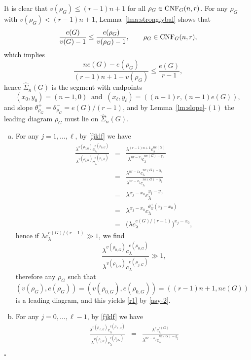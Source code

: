 \documentclass[12pt]{article}
\newenvironment{Proof}{\removelastskip\par\medskip
\noindent{\em Proof.} \rm}{\penalty-20\null\hfill$\square$\par\medbreak}
\numberwithin{equation}{section}
\begin{document}
\begin{Proof}
  It is clear that $v(\rho_G)\le (r-1)n+1$ for all $\rho_G\in {\rm CNF}_G(n,r)$. For any $\rho_G$ with $v(\rho_G)<(r-1)n+1$,
 Lemma~\ref{lma:stronglybal} shows that 
\begin{equation}\label{condi-1}
  \frac {e(G)}{v(G)-1}\le\frac{e(\rho_G)}{v(\rho_G)-1},
  \qquad
  \rho_G\in {\rm CNF}_G(n,r), 
\end{equation}
 which implies 
\begin{equation}
\nonumber
          \frac{ne(G)-e(\rho_G)}{(r-1)n+1-v(\rho_G)}\le\frac{e(G)}{r-1}, 
\end{equation}
 hence 
$\widehat{\Sigma}_n(G)$ 
 is the segment with endpoints
 $$
 (x_0,y_0)=(n-1,0)
 \ \mbox{ and } \ 
 (x_\ell,y_\ell)=((n-1)r,(n-1) e(G)),
 $$ 
 and slope
 $
 \theta^+_{\rho_G}
=\theta^-_{\rho_G}
=
 e(G) / ( r-1)$,
 and by Lemma~\ref{lm:slope}-$(1)$
 the leading diagram $\rho_G$ must lie on 
$\widehat{\Sigma}_n(G)$.  
 \begin{enumerate}[a)]
   \item 
     For any $j=1,\dots,\ell$, by
     \eqref{fjklf} 
 we have
\begin{eqnarray*} 
 \frac{\lambda^{v(\rho_{0,G})}c_\lambda^{e(\rho_{0,G})}}{\lambda^{v(\rho_{j,G})}c_\lambda^{e(\rho_{j,G})}} & = & 
 \frac{\lambda^{(r-1)n+1}c_\lambda^{ne(G)}}{\lambda^{nr-x_j}c_\lambda^{ne(G)-y_j}}
 \\
  & = & 
 \frac{\lambda^{nr-x_0}c_\lambda^{ne(G)-y_0}}{\lambda^{nr-x_j}c_\lambda^{ne(G)-y_j}}
 \\
  & = & 
 \lambda^{x_j-x_0} c_\lambda^{y_j-y_0}
 \\
  & = & 
 \lambda^{x_j-x_0} c_\lambda^{\theta^+_G (x_j-x_0)}
 \\
  & = & 
\big(\lambda c_\lambda^{e(G) / ( r-1 )}\big)^{x_j-x_0},
\end{eqnarray*} 
    hence if $\lambda c_\lambda^{e(G)/(r-1)}\gg1$,
    we find 
$$
 \frac{\lambda^{v(\rho_{0,G})}c_\lambda^{e(\rho_{0,G})}}{\lambda^{v(\rho_{j,G})}c_\lambda^{e(\rho_{j,G})}}\gg1, 
  $$
 therefore any $\rho_G$ such that 
       $(v(\rho_G),e(\rho_G))=(v(\rho_{0,G}),e(\rho_{0,G}))=((r-1)n+1,ne(G))$
 is a leading diagram, 
 and this yields \eqref{r1} by \eqref{asy-2}.  
\item
 For any $j=0,\dots,\ell-1$, by \eqref{fjklf} 
     we have
\begin{eqnarray*} 
  \frac{\lambda^{v(\rho_{\ell , G})}c_\lambda^{e(\rho_{\ell , G})}}{\lambda^{v(\rho_{j , G})}c_\lambda^{e(\rho_{j , G})}}
  & = &
  \frac{\lambda^{r}c_\lambda^{e(G)}}{\lambda^{nr-x_j}c_\lambda^{ne(G)-y_j}}

\end{eqnarray*}
\end{enumerate}
\end{Proof}
\end{document}
